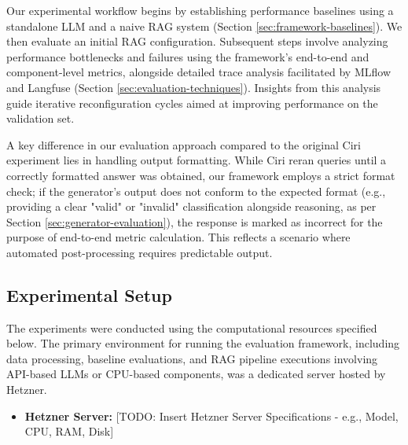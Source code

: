 Our experimental workflow begins by establishing performance baselines using a standalone LLM and a naive RAG system (Section \ref{sec:framework-baselines}). We then evaluate an initial RAG configuration. Subsequent steps involve analyzing performance bottlenecks and failures using the framework's end-to-end and component-level metrics, alongside detailed trace analysis facilitated by MLflow and Langfuse (Section \ref{sec:evaluation-techniques}). Insights from this analysis guide iterative reconfiguration cycles aimed at improving performance on the validation set.

A key difference in our evaluation approach compared to the original Ciri experiment \cite{Lian.2024} lies in handling output formatting. While Ciri reran queries until a correctly formatted answer was obtained, our framework employs a strict format check; if the generator's output does not conform to the expected format (e.g., providing a clear "valid" or "invalid" classification alongside reasoning, as per Section \ref{sec:generator-evaluation}), the response is marked as incorrect for the purpose of end-to-end metric calculation. This reflects a scenario where automated post-processing requires predictable output.





\subsection{Experimental Setup} \label{sec:exp_setup}
The experiments were conducted using the computational resources specified below. The primary environment for running the evaluation framework, including data processing, baseline evaluations, and RAG pipeline executions involving API-based LLMs or CPU-based components, was a dedicated server hosted by Hetzner.

\begin{itemize}
    \item \textbf{Hetzner Server:} [TODO: Insert Hetzner Server Specifications - e.g., Model, CPU, RAM, Disk]
\end{itemize}

